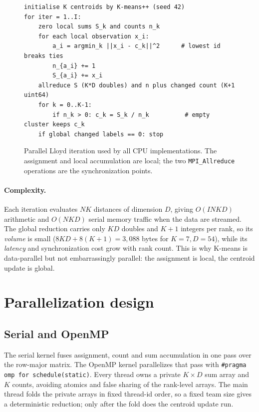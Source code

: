 \documentclass[10pt,a4paper]{article}
\newcommand{\code}[1]{\texttt{#1}}
\begin{document}
\begin{figure}[H]
\centering
\begin{minipage}{0.93\textwidth}
\small
\begin{verbatim}
initialise K centroids by K-means++ (seed 42)
for iter = 1..I:
    zero local sums S_k and counts n_k
    for each local observation x_i:
        a_i = argmin_k ||x_i - c_k||^2      # lowest id breaks ties
        n_{a_i} += 1
        S_{a_i} += x_i
    allreduce S (K*D doubles) and n plus changed count (K+1 uint64)
    for k = 0..K-1:
        if n_k > 0: c_k = S_k / n_k          # empty cluster keeps c_k
    if global changed labels == 0: stop
\end{verbatim}
\end{minipage}
\caption{Parallel Lloyd iteration used by all CPU implementations. The
assignment and local accumulation are local; the two \code{MPI\_Allreduce}
operations are the synchronization points.}
\label{fig:pseudocode}
\end{figure}

\paragraph{Complexity.}
Each iteration evaluates $N K$ distances of dimension $D$, giving
$O(I N K D)$ arithmetic and $O(NKD)$ serial memory traffic when the data are
streamed. The global reduction carries only $K D$ doubles and $K+1$ integers
per rank, so its \emph{volume} is small ($8KD+8(K+1)=3{,}088$ bytes for
$K=7,D=54$), while its \emph{latency} and synchronization cost grow with rank
count. This is why K-means is data-parallel but not embarrassingly parallel:
the assignment is local, the centroid update is global.

\section{Parallelization design}
\subsection{Serial and OpenMP}
The serial kernel fuses assignment, count and sum accumulation in one pass over
the row-major matrix. The OpenMP \citep{dagum1998} kernel parallelizes that pass with
\code{\#pragma omp for schedule(static)}. Every thread owns a private
$K\times D$ sum array and $K$ counts, avoiding atomics and false sharing of the
rank-level arrays. The main thread folds the private arrays in fixed thread-id
order, so a fixed team size gives a deterministic reduction; only after the
fold does the centroid update run.
\end{document}
